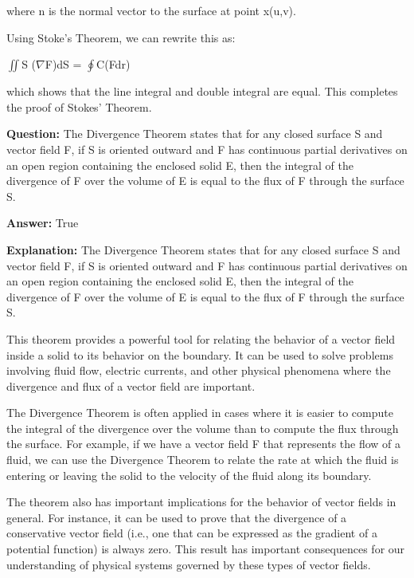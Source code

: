 \documentclass{article}
\begin{document}
where n is the normal vector to the surface at point x(u,v).

Using Stoke's Theorem, we can rewrite this as:

\ensuremath{\iint}S (\ensuremath{\nabla}{\texttimes}F){\textperiodcentered}dS = \ensuremath{\oint}C(F{\textperiodcentered}dr)

which shows that the line integral and double integral are equal. This completes the proof of Stokes' Theorem.
                
                \vspace{0.5cm} 
        
            
                \textbf {Question:} The Divergence Theorem states that for any closed surface S and vector field F, if S is oriented outward and F has continuous partial derivatives on an open region containing the enclosed solid E, then the integral of the divergence of F over the volume of E is equal to the flux of F through the surface S.
                
                \textbf{Answer:} True

                \textbf{Explanation:} The Divergence Theorem states that for any closed surface S and vector field F, if S is oriented outward and F has continuous partial derivatives on an open region containing the enclosed solid E, then the integral of the divergence of F over the volume of E is equal to the flux of F through the surface S.

This theorem provides a powerful tool for relating the behavior of a vector field inside a solid to its behavior on the boundary. It can be used to solve problems involving fluid flow, electric currents, and other physical phenomena where the divergence and flux of a vector field are important.

The Divergence Theorem is often applied in cases where it is easier to compute the integral of the divergence over the volume than to compute the flux through the surface. For example, if we have a vector field F that represents the flow of a fluid, we can use the Divergence Theorem to relate the rate at which the fluid is entering or leaving the solid to the velocity of the fluid along its boundary.

The theorem also has important implications for the behavior of vector fields in general. For instance, it can be used to prove that the divergence of a conservative vector field (i.e., one that can be expressed as the gradient of a potential function) is always zero. This result has important consequences for our understanding of physical systems governed by these types of vector fields.
\end{document}
